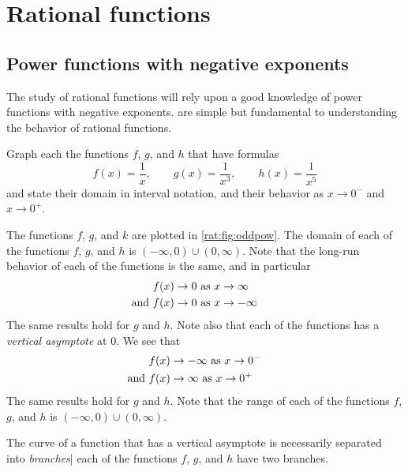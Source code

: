 \section{Rational functions}
\subsection*{Power functions with negative exponents}
The study of rational functions will rely upon a good knowledge 
of power functions with negative exponents.  are 
simple but fundamental to understanding the behavior of rational functions.
\begin{pccexample}\label{rat:ex:oddpow}
	Graph each the functions $f$, $g$, and $h$ that have 
	formulas
	\[
		f(x)=\frac{1}{x},\qquad g(x)=\dfrac{1}{x^3},\qquad h(x)=\dfrac{1}{x^5}
	\]
	and state their domain in interval notation, and their 
	behavior as $x\rightarrow 0^-$ and $x\rightarrow 0^+$.
	\begin{pccsolution}
		The functions $f$, $g$, and $k$ are plotted in \cref{rat:fig:oddpow}.
		The domain of each of the functions $f$, $g$, and $h$ is $(-\infty,0)\cup (0,\infty)$. Note that 
		the long-run behavior of each of the functions is the same, and in particular
		\begin{align*}
			f(x)\rightarrow 0                         & \text{ as } x\rightarrow\infty  \\ 
			\mathllap{\text{and }}  f(x)\rightarrow 0 & \text{ as } x\rightarrow-\infty 
		\end{align*}
		The same results hold for $g$ and $h$. Note also that each of the functions
		has a \emph{vertical asymptote} at $0$. We see that
		\begin{align*}
			                       & f(x)\rightarrow -\infty                          \text{ as } x\rightarrow 0^- \\ 
			\mathllap{\text{and }} & f(x)\rightarrow \infty  \text{ as } x\rightarrow 0^+                          
		\end{align*}
		The same results hold for $g$ and $h$. Note that the range of each of the functions
		$f$, $g$, and $h$ is $(-\infty,0)\cup (0,\infty)$.
		
		The curve of a function that has a vertical asymptote is necessarily separated 
		into \emph{branches}| each of the functions $f$, $g$, and $h$ have two branches. 
		

\end{pccsolution}
\end{pccexample}
